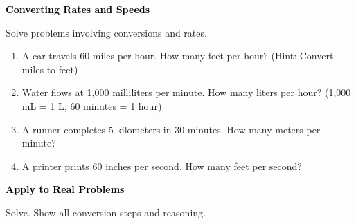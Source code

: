 \documentclass[12pt, letterpaper, fleqn]{article}
\begin{document}
\newpage

\begin{tcolorbox}[colback=customteal!20]
\large\textcolor{black}{\textbf{Converting Rates and Speeds}}
\end{tcolorbox}

\noindent
Solve problems involving conversions and rates.

\vspace{3mm}

\begin{enumerate}[itemsep=2.2cm, leftmargin=0.6cm]

\item A car travels 60 miles per hour. How many feet per hour? (Hint: Convert miles to feet)

\vspace{2cm}

\item Water flows at 1,000 milliliters per minute. How many liters per hour? (1,000 mL = 1 L, 60 minutes = 1 hour)

\vspace{2cm}

\item A runner completes 5 kilometers in 30 minutes. How many meters per minute?

\vspace{2cm}

\item A printer prints 60 inches per second. How many feet per second?

\vspace{2cm}

\end{enumerate}

\newpage

\begin{tcolorbox}[colback=customteal!20]
\large\textcolor{black}{\textbf{Apply to Real Problems}}
\end{tcolorbox}

\noindent
Solve. Show all conversion steps and reasoning.

\vspace{3mm}
\end{document}

